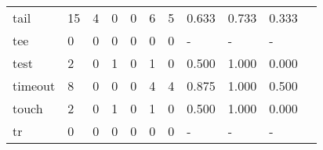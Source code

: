 \begin{longtable}{lp{1.2cm}p{1.2cm}p{1.2cm}p{1.2cm}p{1.2cm}p{1.2cm}p{1.2cm}p{1.2cm}p{1.2cm}p{1.2cm}}
tail      &                                    15 &                                                  4 &                                                0 &                                               0 &                                                6 &                                              5 &                                         0.633 &                                              0.733 &                                              0.333 \\
tee       &                                     0 &                                                  0 &                                                0 &                                               0 &                                                0 &                                              0 &                                             - &                                                  - &                                                  - \\
test      &                                     2 &                                                  0 &                                                1 &                                               0 &                                                1 &                                              0 &                                         0.500 &                                              1.000 &                                              0.000 \\
timeout   &                                     8 &                                                  0 &                                                0 &                                               0 &                                                4 &                                              4 &                                         0.875 &                                              1.000 &                                              0.500 \\
touch     &                                     2 &                                                  0 &                                                1 &                                               0 &                                                1 &                                              0 &                                         0.500 &                                              1.000 &                                              0.000 \\
tr        &                                     0 &                                                  0 &                                                0 &                                               0 &                                                0 &                                              0 &                                             - &                                                  - &                                                  - \\

\end{longtable}
